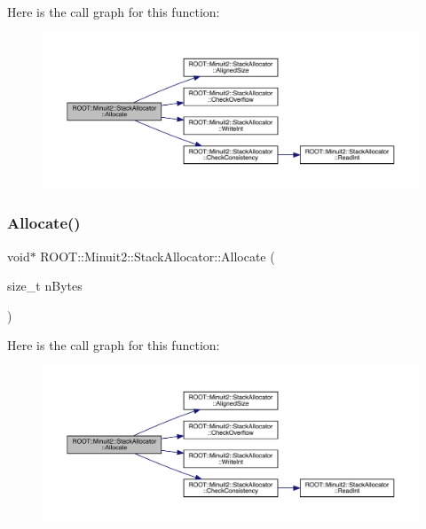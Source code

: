 Here is the call graph for this function\+:
\nopagebreak
\begin{figure}[H]
\begin{center}
\leavevmode
\includegraphics[width=350pt]{d3/d1e/classROOT_1_1Minuit2_1_1StackAllocator_a1fb4d1744055446776080af229679e03_cgraph}
\end{center}
\end{figure}
\mbox{\label{classROOT_1_1Minuit2_1_1StackAllocator_a1fb4d1744055446776080af229679e03}} 
\subsubsection{\texorpdfstring{Allocate()}{Allocate()}\hspace{0.1cm}{\footnotesize\ttfamily [2/3]}}
{\footnotesize\ttfamily void$\ast$ R\+O\+O\+T\+::\+Minuit2\+::\+Stack\+Allocator\+::\+Allocate (\begin{DoxyParamCaption}\item[{size\+\_\+t}]{n\+Bytes }\end{DoxyParamCaption})\hspace{0.3cm}{\ttfamily [inline]}}

Here is the call graph for this function\+:
\nopagebreak
\begin{figure}[H]
\begin{center}
\leavevmode
\includegraphics[width=350pt]{d3/d1e/classROOT_1_1Minuit2_1_1StackAllocator_a1fb4d1744055446776080af229679e03_cgraph}
\end{center}
\end{figure}
\mbox{\label{classROOT_1_1Minuit2_1_1StackAllocator_a1fb4d1744055446776080af229679e03}} 
